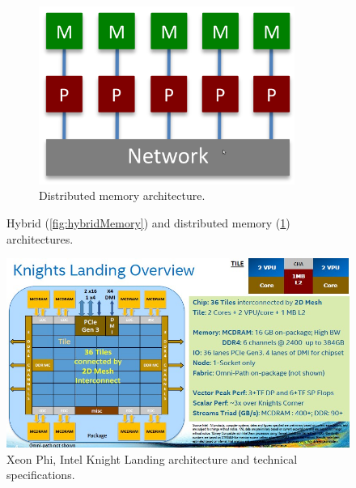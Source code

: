\begin{description}
\begin{figure}
\begin{subfigure}{0.55\textwidth}
 	\end{subfigure}%
 	\begin{subfigure}{0.45\textwidth}
 		\centering
 		\caption{Distributed memory architecture.}
 		\label{fig:distribuiteMemory}
 		\includegraphics[width=0.92\textwidth]{./images/parallel_programming/distribuitedMemory}
 	\end{subfigure}%
 \caption[Hybrid and distributed memory architectures.]{Hybrid (\ref{fig:hybridMemory}) and distributed memory (\ref{fig:distribuiteMemory}) architectures.}
 \label{fig:hybrid_distributed}
 \end{figure}

\begin{figure}
	\centering
	\includegraphics[width=1.0\textwidth]{./images/parallel_programming/xeonphi}
	\caption{Xeon Phi, Intel Knight Landing architecture and technical specifications.}
	\label{fig:intelPhi}
\end{figure}




\end{description}
